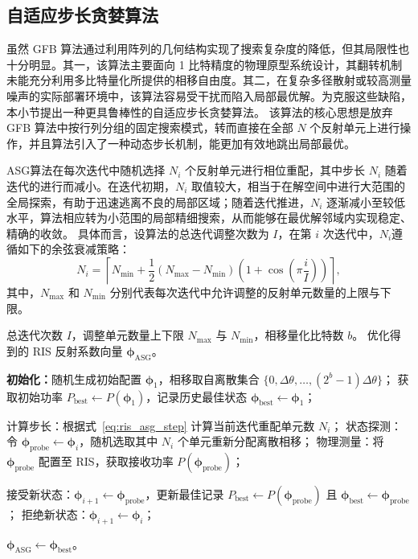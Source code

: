 \subsection{自适应步长贪婪算法}

虽然 GFB 算法通过利用阵列的几何结构实现了搜索复杂度的降低，但其局限性也十分明显。其一，该算法主要面向 1 比特精度的物理原型系统设计，其翻转机制未能充分利用多比特量化所提供的相移自由度。其二，在复杂多径散射或较高测量噪声的实际部署环境中，该算法容易受干扰而陷入局部最优解。为克服这些缺陷，本小节提出一种更具鲁棒性的自适应步长贪婪算法。
该算法的核心思想是放弃 GFB 算法中按行列分组的固定搜索模式，转而直接在全部 $N$ 个反射单元上进行操作，并且算法引入了一种动态步长机制，能更加有效地跳出局部最优。

ASG算法在每次迭代中随机选择 $N_i$ 个反射单元进行相位重配，其中步长 $N_i$ 随着迭代的进行而减小。在迭代初期，$N_i$ 取值较大，相当于在解空间中进行大范围的全局探索，有助于迅速逃离不良的局部区域；随着迭代推进，$N_i$ 逐渐减小至较低水平，算法相应转为小范围的局部精细搜索，从而能够在最优解邻域内实现稳定、精确的收敛。
具体而言，设算法的总迭代调整次数为 $I$，在第 $i$ 次迭代中，$N_i$遵循如下的余弦衰减策略：
\begin{equation}\label{eq:ris_asg_step}
	N_i = \left\lceil N_{\min} + \frac{1}{2}(N_{\max} - N_{\min}) \left( 1 + \cos\left( \pi \frac{i}{I} \right) \right) \right\rceil,
\end{equation}
其中，$N_{\max}$ 和 $N_{\min}$ 分别代表每次迭代中允许调整的反射单元数量的上限与下限。

\begin{algorithm}[!htbp]
	\caption{自适应步长贪婪算法（ASG）}
	\label{alg:ris_asg}
	\begin{algorithmic}[1]
		\REQUIRE 总迭代次数 $I$，调整单元数量上下限 $N_{\max}$ 与 $N_{\min}$，相移量化比特数 $b$。
		\ENSURE 优化得到的 RIS 反射系数向量 $\bm{\phi}_{\text{ASG}}$。
		
		\STATE \textbf{初始化：}随机生成初始配置 $\bm{\phi}_1$，相移取自离散集合 $\{0, \Delta\theta, \dots, (2^b-1)\Delta\theta\}$；
		\STATE 获取初始功率 $P_{\text{best}} \leftarrow P(\bm{\phi}_1)$，记录历史最佳状态 $\bm{\phi}_{\text{best}} \leftarrow \bm{\phi}_1$；
		
		\STATE 计算步长：根据式~\eqref{eq:ris_asg_step} 计算当前迭代重配单元数 $N_i$；
		\STATE 状态探测：令 $\bm{\phi}_{\text{probe}} \leftarrow \bm{\phi}_i$，随机选取其中 $N_i$ 个单元重新分配离散相移；
		\STATE 物理测量：将 $\bm{\phi}_{\text{probe}}$ 配置至 RIS，获取接收功率 $P(\bm{\phi}_{\text{probe}})$；
		
		\STATE 接受新状态：$\bm{\phi}_{i+1} \leftarrow \bm{\phi}_{\text{probe}}$，更新最佳记录 $P_{\text{best}} \leftarrow P(\bm{\phi}_{\text{probe}})$ 且 $\bm{\phi}_{\text{best}} \leftarrow \bm{\phi}_{\text{probe}}$；
		\ELSE
		\STATE 拒绝新状态：$\bm{\phi}_{i+1} \leftarrow \bm{\phi}_i$；
		\ENDIF
		\ENDFOR
		
		\RETURN $\bm{\phi}_{\text{ASG}} \leftarrow \bm{\phi}_{\text{best}}$。
	\end{algorithmic}
\end{algorithm}

